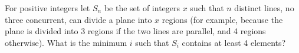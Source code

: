 For positive integers  let $S_n$ be the set of integers $x$ such that $n$ distinct lines, no three concurrent, can divide a plane into $x$ regions (for example,  because the plane is divided into 3 regions if the two lines are parallel, and 4 regions otherwise). What is the minimum $i$ such that $S_i$ contains at least 4 elements?